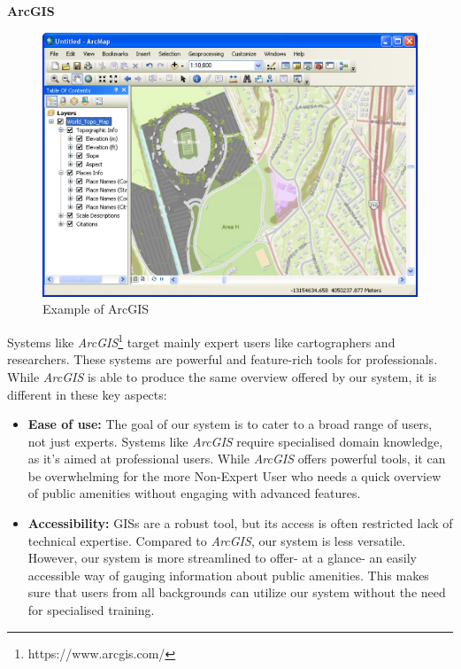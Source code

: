 \newpage{}

\textbf{ArcGIS}

\begin{figure}[htbp]
  \centering{}
  \includegraphics[width=0.85\columnwidth]{images/arcgis.png}
  \caption{Example of ArcGIS}
  \label{fig:arcgis}
\end{figure}

Systems like \textit{ArcGIS}\footnote{https://www.arcgis.com/} target
mainly expert users like cartographers and researchers. These systems are powerful
and feature-rich tools for professionals. While \textit{ArcGIS} is able to produce
the same overview offered by our system, it is different in these key aspects:

\begin{samepage}
\begin{itemize}
    \item{\textbf{Ease of use:} The goal of our system is to cater to a broad
    range of users, not just experts. Systems like \textit{ArcGIS} require
    specialised domain knowledge, as it's aimed at professional users. While
    \textit{ArcGIS} offers powerful tools, it can be overwhelming for the more
    Non-Expert User who needs a quick overview of public amenities without engaging
    with advanced features.}
  \vspace{1.25mm}

  \item{\textbf{Accessibility:} GISs are a robust tool, but its access is often
  restricted lack of technical expertise. Compared to \textit{ArcGIS}, our
  system is less versatile. However, our system is more streamlined to offer- at
  a glance- an easily accessible way of gauging information about public
  amenities. This makes sure that users from all backgrounds can utilize our
  system without the need for specialised training.}
  \vspace{1.25mm}

\end{itemize}
\end{samepage}

